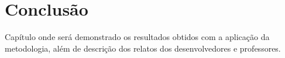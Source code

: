 \documentclass[
	12pt,				%
	openright,			%
	twoside,			%
	a4paper,			%
	english,			%
	french,				%
	spanish,			%
	brazil				%
	]{abntex2}
\begin{document}








\chapter{Conclusão}

Capítulo onde será demonstrado os resultados obtidos com a aplicação da metodologia, além de descrição dos relatos dos desenvolvedores e professores.

\postextual



%
%


\end{document}
